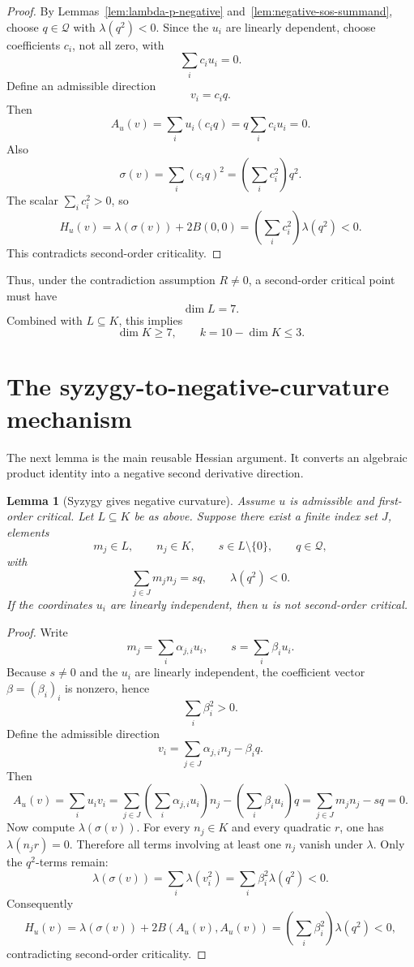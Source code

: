 \documentclass[11pt]{article}
\newtheorem{lemma}[theorem]{Lemma}
\newcommand{\Quad}{\mathcal Q}
\begin{document}
\begin{proof}
By Lemmas~\ref{lem:lambda-p-negative} and~\ref{lem:negative-sos-summand}, choose \(q\in\Quad\) with \(\lambda(q^2)<0\).  Since the \(u_i\) are linearly dependent, choose coefficients \(c_i\), not all zero, with
\[
\sum_i c_i u_i=0.
\]
Define an admissible direction
\[
v_i=c_iq.
\]
Then
\[
A_u(v)=\sum_i u_i(c_iq)=q\sum_i c_i u_i=0.
\]
Also
\[
\sigma(v)=\sum_i(c_iq)^2=\left(\sum_i c_i^2\right)q^2.
\]
The scalar \(\sum_i c_i^2
>0\), so
\[
H_u(v)
=
\lambda(\sigma(v))+2B(0,0)
=
\left(\sum_i c_i^2\right)\lambda(q^2)<0.
\]
This contradicts second-order criticality.
\end{proof}

Thus, under the contradiction assumption \(R\ne0\), a second-order critical point must have
\[
\dim L=7.
\]
Combined with \(L\subseteq K\), this implies
\[
\dim K\ge7,
\qquad
k=10-\dim K\le3.
\]

\section{The syzygy-to-negative-curvature mechanism}

The next lemma is the main reusable Hessian argument.  It converts an algebraic product identity into a negative second derivative direction.

\begin{lemma}[Syzygy gives negative curvature]\label{lem:syzygy-negative-curvature}
Assume \(u\) is admissible and first-order critical.  Let \(L\subseteq K\) be as above.  Suppose there exist a finite index set \(J\), elements
\[
m_j\in L,
\qquad
n_j\in K,
\qquad
s\in L\setminus\{0\},
\qquad
q\in\Quad,
\]
with
\[
\sum_{j\in J}m_jn_j=sq,
\qquad
\lambda(q^2)<0.
\]
If the coordinates \(u_i\) are linearly independent, then \(u\) is not second-order critical.
\end{lemma}

\begin{proof}
Write
\[
m_j=\sum_i \alpha_{j,i}u_i,
\qquad
s=\sum_i\beta_i u_i.
\]
Because \(s\ne0\) and the \(u_i\) are linearly independent, the coefficient vector \(\beta=(\beta_i)_i\) is nonzero, hence
\[
\sum_i\beta_i^2>0.
\]
Define the admissible direction
\[
v_i=\sum_{j\in J}\alpha_{j,i}n_j-\beta_iq.
\]
Then
\[
A_u(v)
=
\sum_i u_iv_i
=
\sum_{j\in J}\left(\sum_i\alpha_{j,i}u_i\right)n_j
-
\left(\sum_i\beta_i u_i\right)q
=
\sum_{j\in J}m_jn_j-sq
=0.
\]
Now compute \(\lambda(\sigma(v))\).  For every \(n_j\in K\) and every quadratic \(r\), one has \(\lambda(n_jr)=0\).  Therefore all terms involving at least one \(n_j\) vanish under \(\lambda\).  Only the \(q^2\)-terms remain:
\[
\lambda(\sigma(v))
=
\sum_i\lambda(v_i^2)
=
\sum_i\beta_i^2\lambda(q^2)<0.
\]
Consequently
\[
H_u(v)=\lambda(\sigma(v))+2B(A_u(v),A_u(v))
=\left(\sum_i\beta_i^2\right)\lambda(q^2)<0,
\]
contradicting second-order criticality.
\end{proof}
\end{document}
